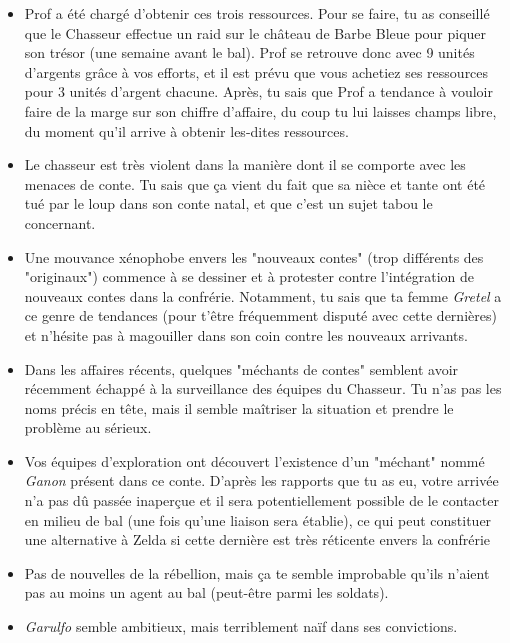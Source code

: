 {\begin{itemize}
		\item Prof a été chargé d'obtenir ces trois ressources. Pour se faire, tu as conseillé que le Chasseur effectue un raid sur le château de Barbe Bleue pour piquer son trésor (une semaine avant le bal). Prof se retrouve donc avec 9 unités d'argents grâce à vos efforts, et il est prévu que vous achetiez ses ressources pour 3 unités d'argent chacune. Après, tu sais que Prof a tendance à vouloir faire de la marge sur son chiffre d'affaire, du coup tu lui laisses champs libre, du moment qu'il arrive à obtenir les-dites ressources.
		
		\item Le chasseur est très violent dans la manière dont il se comporte avec les menaces de conte. Tu sais que ça vient du fait que sa nièce et tante ont été tué par le loup dans son conte natal, et que c'est un sujet tabou le concernant.
		
		\item Une mouvance xénophobe envers les "nouveaux contes" (trop différents des "originaux") commence à se dessiner et à protester contre l'intégration de nouveaux contes dans la confrérie. Notamment, tu sais que ta femme \emph{Gretel} a ce genre de tendances (pour t'être fréquemment disputé avec cette dernières) et n'hésite pas à magouiller dans son coin contre les nouveaux arrivants.
		
		\item Dans les affaires récents, quelques "méchants de contes" semblent avoir récemment échappé à la surveillance des équipes du Chasseur. Tu n'as pas les noms précis en tête, mais il semble maîtriser la situation et prendre le problème au sérieux.
		
		\item Vos équipes d'exploration ont découvert l'existence d'un "méchant" nommé \emph{Ganon} présent dans ce conte. D'après les rapports que tu as eu, votre arrivée n'a pas dû passée inaperçue et il sera potentiellement possible de le contacter en milieu de bal (une fois qu'une liaison sera établie), ce qui peut constituer une alternative à Zelda si cette dernière est très réticente envers la confrérie
		
		\item Pas de nouvelles de la rébellion, mais ça te semble improbable qu'ils n'aient pas au moins un agent au bal (peut-être parmi les soldats).
		
		\item \emph{Garulfo} semble ambitieux, mais terriblement naïf dans ses convictions.
		

\end{itemize}}

